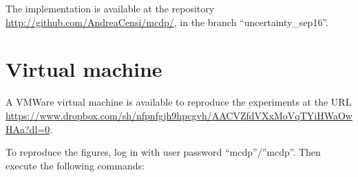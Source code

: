 The implementation is available at the repository \url{http://github.com/AndreaCensi/mcdp/},
in the branch ``uncertainty\_sep16''.

\section{Virtual machine }

A VMWare virtual machine is available to reproduce the experiments
at the URL \url{https://www.dropbox.com/sh/nfpnfgjh9hpcgvh/AACVZfdVXxMoVqTYiHWaOwHAa?dl=0}.

To reproduce the figures, log in with user password ``mcdp''/''mcdp''.
Then execute the following commands:


\clearpage


